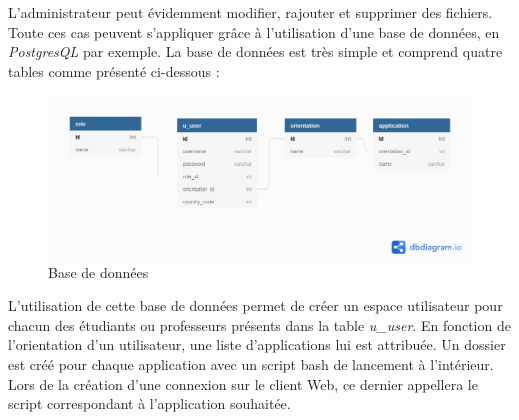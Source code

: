 L'administrateur peut évidemment modifier, rajouter et supprimer des fichiers.
\newline
Toute ces cas peuvent s'appliquer grâce à l'utilisation d'une base de données, en \textit{PostgresQL} par exemple.
La base de données est très simple et comprend quatre tables comme présenté ci-dessous :
\begin{figure}[H]
	\centering
	\includegraphics[scale=0.45]{images/DB.png}
	\caption{Base de données}
	\label{fig:db}
\end{figure}
L'utilisation de cette base de données permet de créer un espace utilisateur pour chacun des étudiants ou professeurs présents dans la table \textit{u\_user}.
En fonction de l'orientation d'un utilisateur, une liste d'applications lui est attribuée.
Un dossier est créé pour chaque application avec un script bash de lancement à l'intérieur.
Lors de la création d'une connexion sur le client Web, ce dernier appellera le script correspondant à l'application souhaitée.


